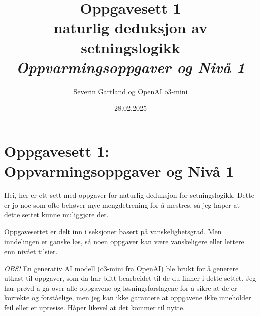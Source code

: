 \documentclass[
    12pt
    ]{report}
\title{Oppgavesett 1\\ \large naturlig deduksjon av setningslogikk\\ \Large \emph{Oppvarmingsoppgaver og Nivå 1}}
\author{Severin Gartland og OpenAI o3-mini}
\date{28.02.2025}
\renewenvironment{abstract}{}%
     {\par%
     }
\begin{document}
\maketitle

\tableofcontents

\chapter{Oppgavesett 1: Oppvarmingsoppgaver og Nivå 1}

\begin{abstract}
    Hei, her er ett sett med oppgaver for naturlig deduksjon for setningslogikk. Dette er jo noe som ofte behøver mye mengdetrening for å mestres, så jeg håper at dette settet kunne muliggjøre det.

    Oppgavesettet er delt inn i seksjoner basert på vanskelighetsgrad. Men inndelingen er ganske løs, så noen oppgaver kan være vanskeligere eller lettere enn nivået tilsier.


    \bigskip
    \emph{OBS!} En generativ AI modell (o3-mini fra OpenAI) ble brukt for å generere utkast til oppgaver, som da har blitt bearbeidet til de du finner i dette settet. Jeg har prøvd å gå over alle oppgavene og løsningsforslagene for å sikre at de er korrekte og forståelige, men jeg kan ikke garantere at oppgavene ikke inneholder feil eller er upresise. Håper likevel at det kommer til nytte.
\end{abstract}


\newpage

\end{document}
